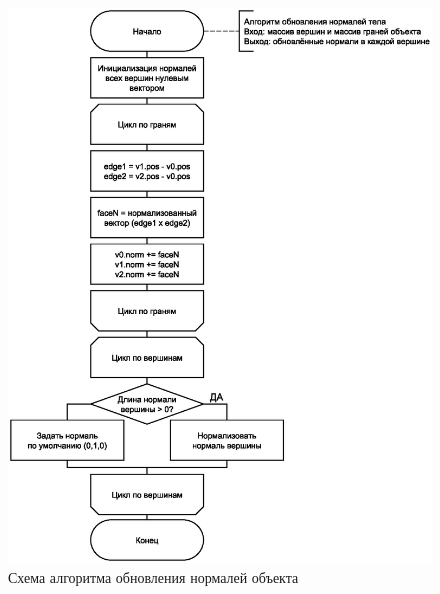 \begin{figure}[h!]
    \centering
    \includegraphics[scale=0.45]{img/normals.eps}
    \caption{Схема алгоритма обновления нормалей объекта}
    \label{fig}
\end{figure}
